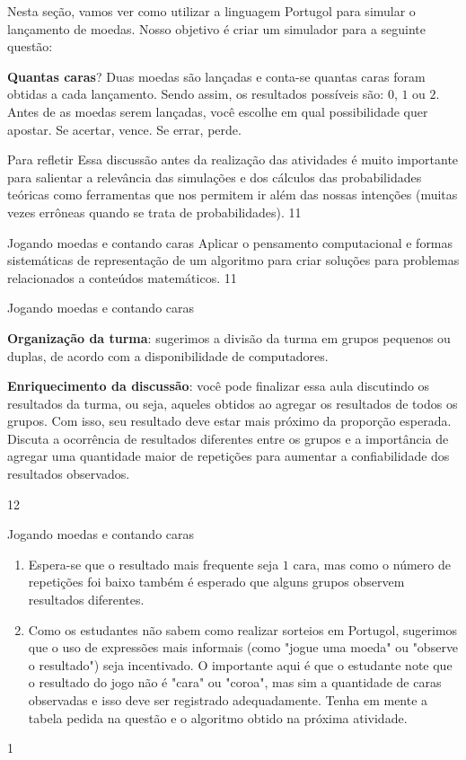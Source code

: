 Nesta seção, vamos ver como utilizar a linguagem Portugol para simular o lançamento de moedas. Nosso objetivo é criar um simulador para a seguinte questão:

\textbf{Quantas caras}? Duas moedas são lançadas e conta-se quantas caras foram obtidas a cada lançamento. Sendo assim, os resultados possíveis são: $0$, $1$ ou $2$. Antes de as moedas serem lançadas, você escolhe em qual possibilidade quer apostar. Se acertar, vence. Se errar, perde.

\begin{sugestions}{Para refletir}
{Essa discussão antes da realização das atividades é muito importante para salientar a relevância das simulações e dos cálculos das probabilidades teóricas como ferramentas que nos permitem ir além das nossas intenções (muitas vezes errôneas quando se trata de probabilidades).}
{1}{1}
\end{sugestions}
\begin{objectives}{Jogando moedas e contando caras}
{
Aplicar o pensamento computacional e formas sistemáticas de representação de um algoritmo para criar soluções para problemas relacionados a conteúdos matemáticos.
}{1}{1}
\end{objectives}
\begin{sugestions}{Jogando moedas e contando caras}
{
\textbf{Organização da turma}: sugerimos a divisão da turma em grupos pequenos ou duplas, de acordo com a disponibilidade de computadores.

\textbf{Enriquecimento da discussão}: você pode finalizar essa aula discutindo os resultados da turma, ou seja, aqueles obtidos ao agregar os resultados de todos os grupos. Com isso, seu resultado deve estar mais próximo da proporção esperada. Discuta a ocorrência de resultados diferentes entre os grupos e a importância de agregar uma quantidade maior de repetições para aumentar a confiabilidade dos resultados observados.
}{1}{2}
\end{sugestions}
\begin{answer}{Jogando moedas e contando caras}
{
\begin{enumerate}[left=1.5em]
\item[\titem{a)} e \titem{b)}] Espera-se que o resultado mais frequente seja $1$ cara, mas como o número de repetições foi baixo também é esperado que alguns grupos observem resultados diferentes.

\setcounter{enumi}{2}
\item Como os estudantes não sabem como realizar sorteios em Portugol, sugerimos que o uso de expressões mais informais (como "jogue uma moeda"{} ou "observe o resultado") seja incentivado. O importante aqui é que o estudante note que o resultado do jogo não é "cara"{} ou "coroa", mas sim a quantidade de caras observadas e isso deve ser registrado adequadamente. Tenha em mente a tabela pedida na questão  e o algoritmo obtido na próxima atividade.
\end{enumerate}
}{1}
\end{answer}

